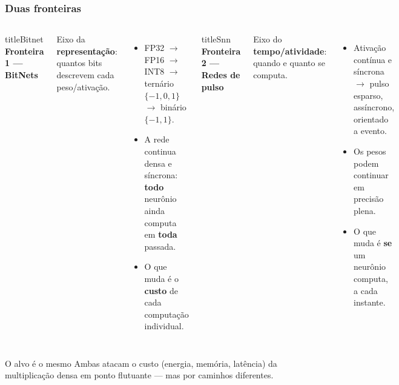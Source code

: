 \begin{frame}
	\frametitle{Duas fronteiras}
	\small
	\begin{columns}
		\begin{beamercolorbox}[sep=5pt,rounded=true,shadow=true]{titleBitnet}
			\textbf{Fronteira 1 --- BitNets}
		\end{beamercolorbox}
		\vspace{1pt}
		\par Eixo da \textbf{representação}: quantos bits descrevem cada peso/ativação.
		\begin{itemize}
			\item FP32 $\rightarrow$ FP16 $\rightarrow$ INT8 $\rightarrow$ ternário $\{-1,0,1\}$ $\rightarrow$ binário $\{-1,1\}$.
			\item A rede continua densa e síncrona: \textbf{todo} neurônio ainda computa em \textbf{toda} passada.
			\item O que muda é o \textbf{custo} de cada computação individual.
		\end{itemize}
		\begin{beamercolorbox}[sep=5pt,rounded=true,shadow=true]{titleSnn}
			\textbf{Fronteira 2 --- Redes de pulso}
		\end{beamercolorbox}
		\vspace{1pt}
		\par Eixo do \textbf{tempo/atividade}: quando e quanto se computa.
		\begin{itemize}
			\item Ativação contínua e síncrona $\rightarrow$ pulso esparso, assíncrono, orientado a evento.
			\item Os pesos podem continuar em precisão plena.
			\item O que muda é \textbf{se} um neurônio computa, a cada instante.
		\end{itemize}
	\end{columns}
	\begin{block}{O alvo é o mesmo}
		Ambas atacam o custo (energia, memória, latência) da multiplicação densa em ponto flutuante --- mas por caminhos diferentes.
	\end{block}
\end{frame}

